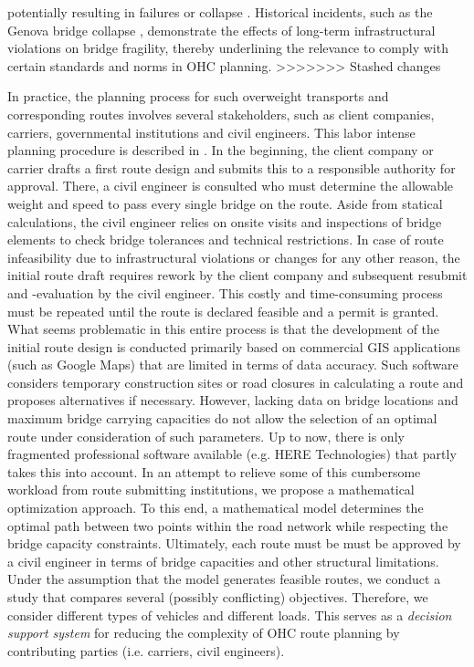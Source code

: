 potentially resulting in failures or collapse \cite{fiorillo2018fragility}. Historical incidents, such as the Genova bridge collapse \cite{Morgese.2020, MorandiNYTimes},  demonstrate the effects of long-term infrastructural violations on bridge fragility, thereby underlining the relevance to comply with certain standards and norms in OHC planning. 
>>>>>>> Stashed changes
\par In practice, the planning process for such overweight transports and corresponding routes involves several stakeholders, such as client companies, carriers, governmental institutions and civil engineers. This labor intense planning procedure is described in \cite{Osegueda.1999}. In the beginning, the client company or carrier drafts a first route design and submits this to a responsible authority for approval. There, a civil engineer is consulted who must determine the allowable weight and speed to pass every single bridge on the route. Aside from statical calculations, the civil engineer relies on onsite visits and inspections of bridge elements to check bridge tolerances and technical restrictions. In case of route infeasibility due to infrastructural violations or changes for any other reason, the initial route draft requires rework by the client company and subsequent resubmit and -evaluation by the civil engineer. This costly and time-consuming process must be repeated until the route is declared feasible and a permit is granted. What seems problematic in this entire process is that the development of the initial route design is conducted primarily based on commercial GIS applications (such as Google Maps) that are limited in terms of data accuracy. Such software considers temporary construction sites or road closures in calculating a route and proposes alternatives if necessary. However, lacking data on bridge locations and maximum bridge carrying capacities do not allow the selection of an optimal route under consideration of such parameters. Up to now, there is only fragmented professional software available (e.g. HERE Technologies) that partly takes this into account. In an attempt to relieve some of this cumbersome workload from route submitting institutions, we propose a mathematical optimization approach. To this end, a mathematical model determines the optimal path between two points within the road network while respecting the bridge capacity constraints. Ultimately, each route must be must be approved by a civil engineer in terms of bridge capacities and other structural limitations. Under the assumption that the model generates feasible routes, we conduct a study that compares several (possibly conflicting) objectives. Therefore, we consider different types of vehicles and different loads. This serves as a \textit{decision support system} for reducing the complexity of OHC route planning by contributing parties (i.e. carriers, civil engineers).
